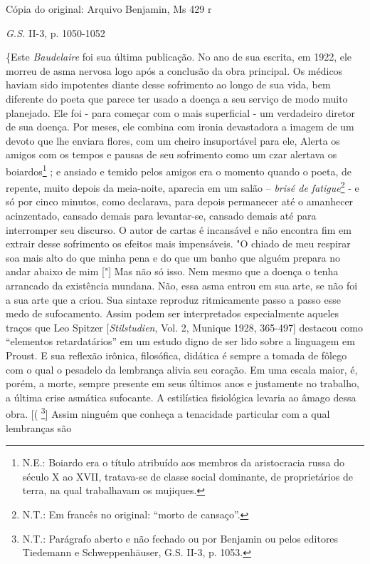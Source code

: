 Cópia do original: Arquivo Benjamin, Ms 429 r

\emph{G.S.} II-3, p. 1050-1052

\{Este \emph{Baudelaire} foi sua última publicação. No ano de sua
escrita, em 1922, ele morreu de asma nervosa logo após a conclusão da
obra principal. Os médicos haviam sido impotentes diante desse
sofrimento ao longo de sua vida, bem diferente do poeta que parece ter
usado a doença a seu serviço de modo muito planejado. Ele foi - para
começar com o mais superficial - um verdadeiro diretor de sua doença.
Por meses, ele combina com ironia devastadora a imagem de um devoto que
lhe enviara flores, com um cheiro insuportável para ele, Alerta os
amigos com os tempos e pausas de seu sofrimento como um czar alertava os
boiardos\footnote{N.E.: Boiardo era o título atribuído aos membros da
  aristocracia russa do século X ao XVII, tratava-se de classe social
  dominante, de proprietários de terra, na qual trabalhavam os mujiques.}
; e ansiado e temido pelos amigos era o momento quando o poeta, de
repente, muito depois da meia-noite, aparecia em um salão -- \emph{brisé
de fatigue}\footnote{N.T.: Em francês no original: ``morto de cansaço''.}
- e só por cinco minutos, como declarava, para depois permanecer até o
amanhecer acinzentado, cansado demais para levantar-se, cansado demais
até para interromper seu discurso. O autor de cartas é incansável e não
encontra fim em extrair desse sofrimento os efeitos mais impensáveis. "O
chiado de meu respirar soa mais alto do que minha pena e do que um banho
que alguém prepara no andar abaixo de mim {[}"{]} Mas não só isso. Nem
mesmo que a doença o tenha arrancado da existência mundana. Não, essa
asma entrou em sua arte, se não foi a sua arte que a criou. Sua sintaxe
reproduz ritmicamente passo a passo esse medo de sufocamento. Assim
podem ser interpretados especialmente aqueles traços que Leo Spitzer
{[}\emph{Stilstudien}, Vol. 2, Munique 1928, 365-497{]} destacou como
``elementos retardatários'' em um estudo digno de ser lido sobre a
linguagem em Proust. E sua reflexão irônica, filosófica, didática é
sempre a tomada de fôlego com o qual o pesadelo da lembrança alivia seu
coração. Em uma escala maior, é, porém, a morte, sempre presente em seus
últimos anos e justamente no trabalho, a última crise asmática
sufocante. A estilística fisiológica levaria ao âmago dessa obra. {[}(
\footnote{N.T.: Parágrafo aberto e não fechado ou por Benjamin ou pelos
  editores Tiedemann e Schweppenhäuser, G.S. II-3, p. 1053.}{]} Assim
ninguém que conheça a tenacidade particular com a qual lembranças são
